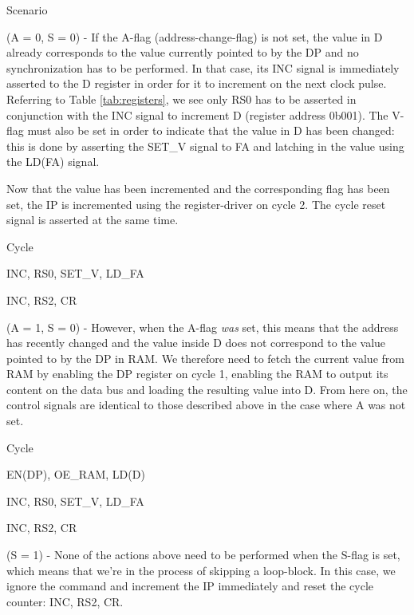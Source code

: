 \begin{labeledenum}{Scenario}
\item (A = 0, S = 0) - If the A-flag (address-change-flag) is not set, the value in D already corresponds to the value currently pointed to by the DP and no synchronization has to be performed. In that case, its INC signal is immediately asserted to the D register in order for it to increment on the next clock pulse. Referring to Table \ref{tab:registers}, we see only RS0 has to be asserted in conjunction with the INC signal to increment D (register address 0b001). The V-flag must also be set in order to indicate that the value in D has been changed: this is done by asserting the SET\_V signal to FA and latching in the value using the LD(FA) signal.

  Now that the value has been incremented and the corresponding flag has been set, the IP is incremented using the register-driver on cycle 2. The cycle reset signal is asserted at the same time.
  
  \begin{labeledenum}{Cycle}
  \item INC, RS0, SET\_V, LD\_FA
  \item INC, RS2, CR
  \end{labeledenum}

\item (A = 1, S = 0) - However, when the A-flag \emph{was} set, this means that the address has recently changed and the value inside D does not correspond to the value pointed to by the DP in RAM. We therefore need to fetch the current value from RAM by enabling the DP register on cycle 1, enabling the RAM to output its content on the data bus and loading the resulting value into D.
  From here on, the control signals are identical to those described above in the case where A was not set.

  \begin{labeledenum}{Cycle}
  \item EN(DP), OE\_RAM, LD(D)
  \item INC, RS0, SET\_V, LD\_FA
  \item INC, RS2, CR
  \end{labeledenum}
  
\item (S = 1) - None of the actions above need to be performed when the S-flag is set, which means that we're in the process of skipping a loop-block. In this case, we ignore the command and increment the IP immediately and reset the cycle counter: INC, RS2, CR.
\end{labeledenum}


